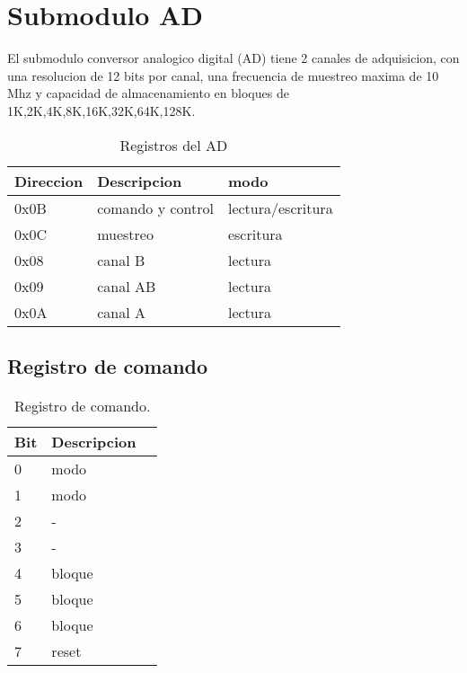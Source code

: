 \section{Submodulo AD}

El submodulo conversor analogico digital (AD) tiene 2 canales de adquisicion,
con una resolucion de 12 bits por canal, una frecuencia de muestreo maxima de 10 Mhz 
y capacidad de almacenamiento en bloques de 1K,2K,4K,8K,16K,32K,64K,128K.

\begin{table}[ht]
    \centering
    \begin{tabular}{|l|l|l|}
    \hline
    Direccion   & Descripcion       & modo\\
    \hline
     0x0B       & comando y control & lectura/escritura\\ 
    \hline
     0x0C       & muestreo          & escritura\\
     \hline
     0x08       & canal B           &lectura   \\
     \hline
     0x09       & canal AB          &lectura   \\
     \hline
     0x0A       & canal A           &lectura   \\
     \hline
\end{tabular}
\caption{\label{tab:registros_ad} Registros del AD}
\end{table}

\subsection{Registro de comando}
\begin{table}[ht]
    \centering
    \begin{tabular}{|l|l|l|}
    \hline
    Bit    & Descripcion \\
    \hline
     0 & modo\\ 
    \hline
     1 & modo\\
     \hline
     2 & - \\
     \hline
     3 & - \\
     \hline
     4 & bloque \\
     \hline
     5 & bloque \\
     \hline
     6 & bloque \\
     \hline
     7 & reset \\
     \hline
\end{tabular}
\caption{\label{tab:registros_ad_cmd}Registro de comando.}
\end{table}

